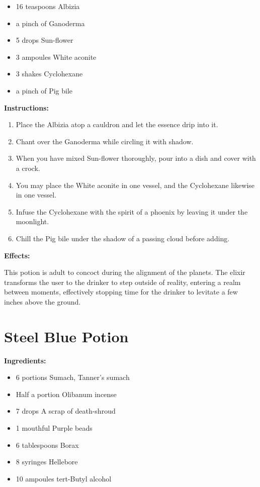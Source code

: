 \documentclass{article}
\begin{document}
\begin{itemize}
  \item 16 teaspoons Albizia
  \item a pinch of Ganoderma
  \item 5 drops Sun-flower
  \item 3 ampoules White aconite
  \item 3 shakes Cyclohexane
  \item a pinch of Pig bile
\end{itemize}

\textbf{Instructions:}

\begin{enumerate}
  \item Place the Albizia atop a cauldron and let the essence drip into it.
  \item Chant over the Ganoderma while circling it with shadow.
  \item When you have mixed Sun-flower thoroughly, pour into a dish and cover with a crock.
  \item You may place the White aconite in one vessel, and the Cyclohexane likewise in one vessel.
  \item Infuse the Cyclohexane with the spirit of a phoenix by leaving it under the moonlight.
  \item Chill the Pig bile under the shadow of a passing cloud before adding.
\end{enumerate}

\textbf{Effects:}

This potion is adult to concoct during the alignment of the planets. The elixir transforms the user to the drinker to step outside of reality, entering a realm between moments, effectively stopping time for the drinker to levitate a few inches above the ground.

\newpage
\section*{Steel Blue Potion}

\textbf{Ingredients:}

\begin{itemize}
  \item 6 portions Sumach, Tanner's sumach
  \item Half a portion Olibanum incense
  \item 7 drops A scrap of death-shroud
  \item 1 mouthful Purple beads
  \item 6 tablespoons Borax
  \item 8 syringes Hellebore
  \item 10 ampoules tert-Butyl alcohol
\end{itemize}
\end{document}
